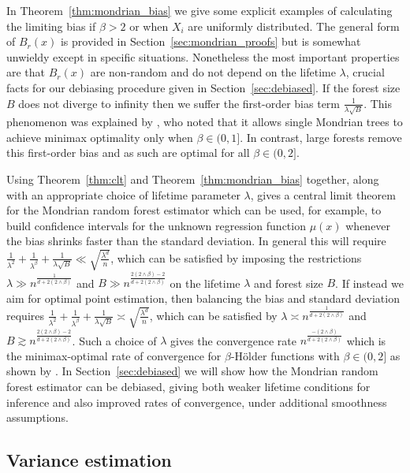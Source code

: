 In Theorem~\ref{thm:mondrian_bias} we give some explicit examples of
calculating the
limiting bias if $\beta > 2$ or when $X_i$ are uniformly distributed. The
general form of $B_r(x)$ is provided in Section~\ref{sec:mondrian_proofs} but
is somewhat unwieldy except in specific situations. Nonetheless the most
important properties are that $B_r(x)$ are non-random and do not depend on the
lifetime $\lambda$, crucial facts for our debiasing procedure given in
Section~\ref{sec:debiased}. If the forest size $B$ does not diverge to infinity
then we suffer the first-order bias term $\frac{1}{\lambda \sqrt B}$. This
phenomenon was explained by \citet{mourtada2020minimax}, who noted that it
allows single Mondrian trees to achieve minimax optimality only when
$\beta \in (0, 1]$. In contrast, large forests remove this first-order bias
and as such are optimal for all $\beta \in (0, 2]$.

Using Theorem~\ref{thm:clt} and Theorem~\ref{thm:mondrian_bias} together,
along with an appropriate choice of lifetime parameter $\lambda$,
gives a central limit theorem for the Mondrian random forest estimator
which can be used, for example, to build confidence intervals
for the unknown regression function $\mu(x)$
whenever the bias shrinks faster than the standard deviation.
In general this will require
$\frac{1}{\lambda^2} + \frac{1}{\lambda^\beta} + \frac{1}{\lambda \sqrt B}
\ll \sqrt{\frac{\lambda^d}{n}}$,
which can be satisfied by imposing the restrictions
$\lambda \gg n^{\frac{1}{d + 2(2 \wedge \beta)}}$
and $B \gg n^{\frac{2(2 \wedge \beta) - 2}{d + 2(2 \wedge \beta)}}$
on the lifetime $\lambda$ and forest size $B$.
If instead we aim for optimal point estimation,
then balancing the bias and standard deviation requires
$\frac{1}{\lambda^2} + \frac{1}{\lambda^\beta} + \frac{1}{\lambda \sqrt B}
\asymp \sqrt{\frac{\lambda^d}{n}}$,
which can be satisfied by
$\lambda \asymp n^{\frac{1}{d + 2(2 \wedge \beta)}}$
and $B \gtrsim n^{\frac{2(2 \wedge \beta) - 2}{d + 2(2 \wedge \beta)}}$.
Such a choice of $\lambda$ gives the convergence rate
$n^{\frac{-(2 \wedge \beta)}{d + 2(2 \wedge \beta)}}$
which is the minimax-optimal rate of convergence \citep{stone1982optimal}
for $\beta$-H{\"o}lder functions with $\beta \in (0,2]$
as shown by \citet[Theorem~2]{mourtada2020minimax}.
In Section~\ref{sec:debiased} we will show how the Mondrian random forest
estimator can be debiased, giving both weaker lifetime conditions for inference
and also improved rates of convergence, under additional smoothness assumptions.

\subsection*{Variance estimation}

